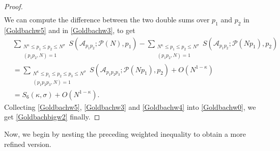 \documentclass[12pt, a4paper]{amsart}
\def\le{\leqslant}
\theoremstyle{plain}
\theoremstyle{remark}
\numberwithin{equation}{section}
\begin{document}
\begin{proof}
\begin{equation}
\begin{split}
\end{split}
\end{equation}
We can compute the difference between the two double sums over $p_1$ and $p_2$ in \eqref{Goldbachw5} and in 
\eqref{Goldbachw3}, to get  
\begin{equation}\label{Goldbachw4}
\begin{split}
&\sum_{\substack{N^\kappa \le p_1 \le p_2 \le N^\sigma \\ (p_1 p_2, N) = 1}}  S(\mathscr{A}_{p_1 p_2}; \mathscr{P}(N), p_1)-\sum_{\substack{N^\kappa \le p_1 \le p_2 \le N^\sigma \\ (p_1 p_2, N) = 1}}  S(\mathscr{A}_{p_1 p_2}; \mathscr{P}(Np_1), p_2)\\
& =  \sum_{\substack{N^\kappa \le p_1 \le p_2 \le p_3 \le N^\sigma \\ (p_1 p_2 p_3, N) = 1}} S(\mathscr{A}_{p_1 p_2 p_3}; \mathscr{P}(N p_1), p_2)+O(N^{1-\kappa})\\
& =  S_6(\kappa,\sigma)+O(N^{1-\kappa}). 
\end{split}
\end{equation}
Collecting \eqref{Goldbachw5}, \eqref{Goldbachw3} and \eqref{Goldbachw4} into \eqref{Goldbachw0},  
we get \eqref{Goldbachbigw2} finally.  
\end{proof}
	
Now, we begin by nesting the preceding weighted inequality to obtain a more refined version.
	
\end{document}
